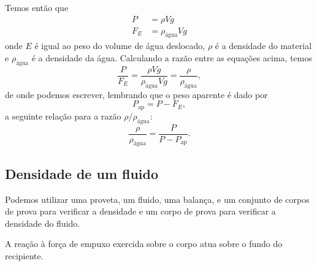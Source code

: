 Temos então que
\begin{align}
	P &= \rho Vg \\
	F_E &= \rho_{\textrm{água}} V g
\end{align}
%
onde $E$ é igual ao peso do volume de água deslocado, $\rho$ é a densidade do material e $\rho_{\textrm{água}}$ é a densidade da água. Calculando a razão entre as equações acima, temos
\begin{equation}
	\frac{P}{F_E} = \frac{\rho Vg}{\rho_{\textrm{água}}Vg} = \frac{\rho}{\rho_{\textrm{água}}},
\end{equation}
%
de onde podemos escrever, lembrando que o peso aparente é dado por
\begin{equation}
	P_{\textrm{ap}} = P - F_E,
\end{equation}
%
a seguinte relação para a razão $\rho/\rho_{\textrm{água}}$:
\begin{equation}\label{Eq:DensRelativa}
	\frac{\rho}{\rho_{\textrm{água}}} = \frac{P}{P-P_{\textrm{ap}}}.
\end{equation}

\subsection{Densidade de um fluido}

Podemos utilizar uma proveta, um fluido, uma balança, e um conjunto de corpos de prova para verificar a densidade e um corpo de prova para verificar a densidade do fluido.


\begin{marginfigure}
\centering
{}
\caption{A reação à força de empuxo exercida sobre o corpo atua sobre o fundo do recipiente.\label{Fig:ReacaoEmpuxo}}
\end{marginfigure}

